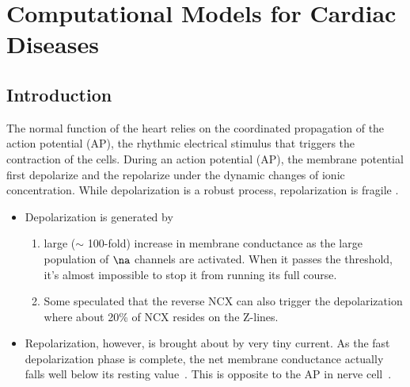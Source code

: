 \chapter{Computational Models for Cardiac Diseases}
\label{chap:cardiac-diseases}

\section{Introduction}
\label{sec:introduction-17}

The normal function of the heart relies on the coordinated propagation of the
action potential (AP), the rhythmic electrical stimulus that triggers the
contraction of the cells. During an action potential (AP), the membrane
potential first depolarize and the repolarize under the dynamic changes of ionic
concentration. While depolarization is a robust process, repolarization is
fragile \citep{tomaselli1994}.
\begin{itemize}
\item Depolarization is generated by 
  \begin{enumerate}
    \item large ($\sim$ 100-fold) increase
  in membrane conductance as the large population of $\na$ channels
  are activated. When it passes the threshold, it's almost impossible to
  stop it from running its full course.
  
    \item Some speculated that the reverse NCX can also trigger the
  depolarization where about 20\%  of NCX resides on the Z-lines.
  \end{enumerate}
  
\item Repolarization, however, is brought about by very tiny
  current. As the fast depolarization phase is complete, the net
  membrane conductance actually falls well below its resting
  value~\cite{weidmann1951}. This is opposite to the AP in nerve
  cell~\citep{cole1939}.
\end{itemize}

